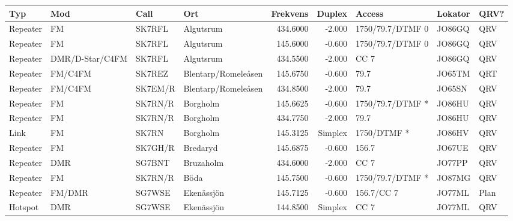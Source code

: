 {\begin{landscape}
\begin{longtable}{llllrrlll}
	\bf Typ           & \bf Mod         & \bf Call & \bf Ort              & \bf Frekvens & \bf Duplex & \bf Access        & \bf Lokator & \bf QRV? \\ \hline
	\endhead
Repeater & FM              & SK7RFL   & Algutsrum            &     434.6000 &     -2.000 & 1750/79.7/DTMF 0  & JO86GQ      & QRV      \\
	Repeater          & FM              & SK7RFL   & Algutsrum            &     145.6000 &     -0.600 & 1750/79.7/DTMF 0  & JO86GQ      & QRV      \\
	Repeater          & DMR/D-Star/C4FM & SK7RFL   & Algutsrum            &     434.5500 &     -2.000 & CC 7              & JO86GQ      & QRV      \\
	Repeater          & FM/C4FM         & SK7REZ   & Blentarp/Romeleåsen  &     145.6750 &     -0.600 & 79.7              & JO65TM      & QRT      \\
	Repeater          & FM/C4FM         & SK7EM/R  & Blentarp/Romeleåsen  &     434.8500 &     -2.000 & 79.7              & JO65SN      & QRV      \\
	Repeater          & FM              & SK7RN/R  & Borgholm             &     145.6625 &     -0.600 & 1750/79.7/DTMF *  & JO86HU      & QRV      \\
	Repeater          & FM              & SK7RN/R  & Borgholm             &     434.7750 &     -2.000 & 79.7              & JO86HU      & QRV      \\
	Link              & FM              & SK7RN    & Borgholm             &     145.3125 &    Simplex & 1750/DTMF *       & JO86HV      & QRV      \\
	Repeater          & FM              & SK7GH/R  & Bredaryd             &     145.6875 &     -0.600 & 156.7             & JO67UE      & QRV      \\
	Repeater          & DMR             & SG7BNT   & Bruzaholm            &     434.6000 &     -2.000 & CC 7              & JO77PP      & QRV      \\
	Repeater          & FM              & SK7RN/R  & Böda                 &     145.7500 &     -0.600 & 1750/79.7/DTMF *  & JO87MG      & QRV      \\
	Repeater          & FM/DMR          & SG7WSE   & Ekenässjön           &     145.7125 &     -0.600 & 156.7/CC 7        & JO77ML      & Plan     \\
	Hotspot           & DMR             & SG7WSE   & Ekenässjön           &     144.8500 &    Simplex & CC 7              & JO77ML      & QRV      \\

\end{longtable}
\end{landscape}}
